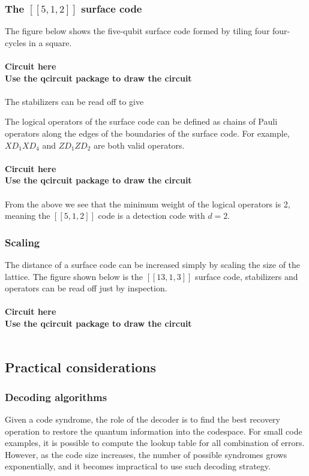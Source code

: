 \documentclass[final,5p,times,twocolumn,authoryear]{elsarticle}
\begin{document}
\subsubsection{The $[[5, 1, 2]]$ surface code}

The figure below shows the five-qubit surface code formed by tiling four four-cycles in a square.
\\
\\
\textbf{Circuit here}
\\
\textbf{Use the qcircuit package to draw the circuit}
\\
\\
The stabilizers can be read off to give

The logical operators of the surface code can be defined as chains of Pauli operators along the edges of the boundaries of the surface code. For example, $XD_1XD_4$ and $ZD_1ZD_2$ are both valid operators.
\\
\\
\textbf{Circuit here}
\\
\textbf{Use the qcircuit package to draw the circuit}
\\
\\
From the above we see that the minimum weight of the logical operators is 2, meaning the $[[5,1,2]]$ code is a detection code with $d=2$.

\subsubsection{Scaling}

The distance of a surface code can be increased simply by scaling the size of the lattice. The figure shown below is the $[[13, 1, 3]]$ surface code, stabilizers and operators can be read off just by inspection.
\\
\\
\textbf{Circuit here}
\\
\textbf{Use the qcircuit package to draw the circuit}
\\
\\

\subsection{Practical considerations}
\subsubsection{Decoding algorithms}
Given a code syndrome, the role of the decoder is to find the best recovery operation to restore the quantum information into the codespace. For small code examples, it is possible to compute the lookup table for all combination of errors. However, as the code size increases, the number of possible syndromes grows exponentially, and it becomes impractical to use such decoding strategy.
\end{document}
